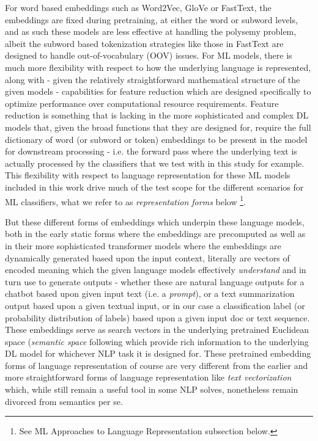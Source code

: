 \documentclass[final]{clv2025}
\begin{document}
For word based embeddings such as Word2Vec, GloVe or FastText, the embeddings are fixed during pretraining, at either the word or subword levels, and as such these models are less effective at handling the polysemy problem, albeit the subword based tokenization strategies like those in FastText are designed to handle out-of-vocabulary (OOV) issues. For ML models, there is much more flexibility with respect to how the underlying language is represented, along with - given the relatively straightforward mathematical structure of the given models - capabilities for feature reduction which are designed specifically to optimize performance over computational resource requirements. Feature reduction is something that is lacking in the more sophisticated and complex DL models that, given the broad functions that they are designed for, require the full dictionary of word (or subword or token) embeddings to be present in the model for downstream processing - i.e. the forward pass where the underlying text is actually processed by the classifiers that we test with in this study for example. This flexibility with respect to language representation for these ML models included in this work drive much of the test scope for the different scenarios for ML classifiers, what we refer to as \textit{representation forms} below \footnote{See ML Approaches to Language Representation subsection below.}.

But these different forms of embeddings which underpin these language models, both in the early static forms where the embeddings are precomputed as well as in their more sophisticated transformer models where the embeddings are dynamically generated based upon the input context, literally are vectors of encoded meaning which the given language models effectively \textit{understand} and in turn use to generate outputs - whether these are natural language outputs for a chatbot based upon given input text (i.e. a \textit{prompt}), or a text summarization output based upon a given textual input, or in our case a classification label (or probability distribution of labels) based upon a given input doc or text sequence. These embeddings serve as search vectors in the underlying pretrained Euclidean space (\textit{semantic space} following \cite{worth} which provide rich information to the underlying DL model for whichever NLP task it is designed for. These pretrained embedding forms of language representation of course are very different from the earlier and more straightforward forms of language representation like \textit{text vectorization} which, while still remain a useful tool in some NLP solves, nonetheless remain divorced from semantics per se. 
\end{document}

